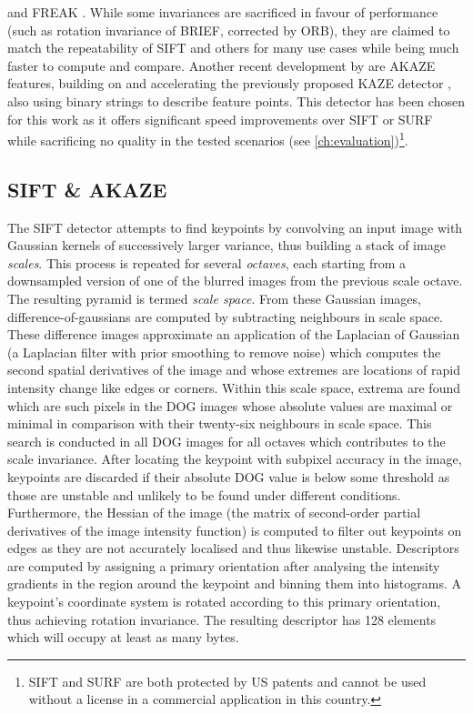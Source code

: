 \citep[Oriented BRIEF]{rublee2011} and FREAK \citep[Fast Retina
Keypoint]{ortiz2012}. While some invariances are sacrificed in favour of
performance (such as rotation invariance of BRIEF, corrected by ORB), they are
claimed to match the repeatability of SIFT and others for many use cases while
being much faster to compute and compare. Another recent development by
\citet{alcantarilla2013} are AKAZE features, building on and accelerating the
previously proposed KAZE detector \citep{alcantarilla2012}, also using binary
strings to describe feature points. This detector has been chosen for this work
as it offers significant speed improvements over SIFT or SURF while sacrificing
no quality in the tested scenarios (see \autoref{ch:evaluation})\footnote{SIFT
and SURF are both protected by US patents and cannot be used without a license
in a commercial application in this country.}.

\subsection{SIFT \& AKAZE}\label{subsec:sift_akaze}

The SIFT detector attempts to find keypoints by convolving an input image with
Gaussian kernels of successively larger variance, thus building a stack of image
\emph{scales}. This process is repeated for several \emph{octaves}, each starting
from a downsampled version of one of the blurred images from the previous scale
octave. The resulting pyramid is termed \emph{scale space}.  From these Gaussian
images, difference-of-gaussians are computed by subtracting neighbours in scale
space. These difference images approximate an application of the Laplacian of
Gaussian (a Laplacian filter with prior smoothing to remove noise) which computes
the second spatial derivatives of the image and whose extremes are locations of
rapid intensity change like edges or corners. Within this scale space, extrema
are found which are such pixels in the DOG images whose absolute values are
maximal or minimal in comparison with their twenty-six neighbours in scale
space. This search is conducted in all DOG images for all octaves which
contributes to the scale invariance. After locating the keypoint with subpixel
accuracy in the image, keypoints are discarded if their absolute DOG value is
below some threshold as those are unstable and unlikely to be found under
different conditions. Furthermore, the Hessian of the
image (the matrix of second-order partial derivatives of the image intensity
function) is computed to filter out keypoints on edges as they are not accurately
localised and thus likewise unstable. Descriptors are computed by assigning a
primary orientation after analysing the intensity gradients in the region around the
keypoint and binning them into histograms. A keypoint's coordinate system is
rotated according to this primary orientation, thus achieving rotation
invariance. The resulting descriptor has 128 elements which will occupy at least
as many bytes.

